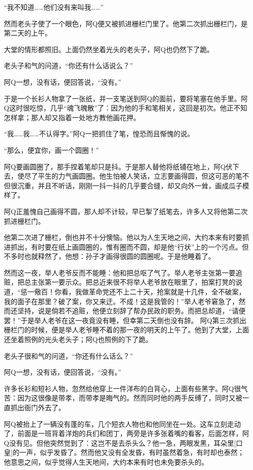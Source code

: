 \documentclass[12pt,UTF8]{ctexbook}
\begin{document}
“我不知道……他们没有来叫我……”

然而老头子使了一个眼色，阿Q便又被抓进栅栏门里了。他第二次抓出栅栏门，是第二天的上午。

大堂的情形都照旧。上面仍然坐着光头的老头子，阿Q也仍然下了跪。

老头子和气的问道，“你还有什么话说么？”

阿Q一想，没有话，便回答说，“没有。”

于是一个长衫人物拿了一张纸，并一支笔送到阿Q的面前，要将笔塞在他手里。阿Q这时很吃惊，几乎“魂飞魄散”了：因为他的手和笔相关，这回是初次。他正不知怎样拿；那人却又指着一处地方教他画花押。

“我……我……不认得字。”阿Q一把抓住了笔，惶恐而且惭愧的说。

“那么，便宜你，画一个圆圈！”

阿Q要画圆圈了，那手捏着笔却只是抖。于是那人替他将纸铺在地上，阿Q伏下去，使尽了平生的力气画圆圈。他生怕被人笑话，立志要画得圆，但这可恶的笔不但很沉重，并且不听话，刚刚一抖一抖的几乎要合缝，却又向外一耸，画成瓜子模样了。

阿Q正羞愧自己画得不圆，那人却不计较，早已掣了纸笔去，许多人又将他第二次抓进栅栏门。

他第二次进了栅栏，倒也并不十分懊恼。他以为人生天地之间，大约本来有时要抓进抓出，有时要在纸上画圆圈的，惟有圈而不圆，却是他“行状”上的一个污点。但不多时也就释然了，他想：孙子才画得很圆的圆圈呢。于是他睡着了。

然而这一夜，举人老爷反而不能睡：他和把总呕了气了。举人老爷主张第一要追赃，把总主张第一要示众。把总近来很不将举人老爷放在眼里了，拍案打凳的说道，“惩一儆百！你看，我做革命党还不上二十天，抢案就是十几件，全不破案，我的面子在那里？破了案，你又来迂。不成！这是我管的！”举人老爷窘急了，然而还坚持，说是倘若不追赃，他便立刻辞了帮办民政的职务。而把总却道，“请便罢！”于是举人老爷在这一夜竟没有睡，但幸第二天倒也没有辞。
阿Q第三次抓出栅栏门的时候，便是举人老爷睡不着的那一夜的明天的上午了。他到了大堂，上面还坐着照例的光头老头子；阿Q也照例的下了跪。

老头子很和气的问道，“你还有什么话么？”

阿Q一想，没有话，便回答说，“没有。”

许多长衫和短衫人物，忽然给他穿上一件洋布的白背心，上面有些黑字。阿Q很气苦：因为这很像是带孝，而带孝是晦气的。然而同时他的两手反缚了，同时又被一直抓出衙门外去了。

阿Q被抬上了一辆没有蓬的车，几个短衣人物也和他同坐在一处。这车立刻走动了，前面是一班背着洋炮的兵们和团丁，两旁是许多张着嘴的看客，后面怎样，阿Q没有见。但他突然觉到了：这岂不是去杀头么？他一急，两眼发黑，耳朵里[口皇]的一声，似乎发昏了。然而他又没有全发昏，有时虽然着急，有时却也泰然；他意思之间，似乎觉得人生天地间，大约本来有时也未免要杀头的。
\end{document}
